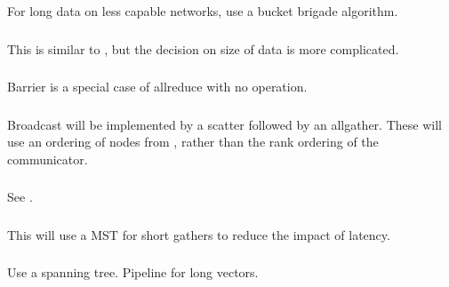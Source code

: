 \documentclass{article}
\begin{document}
For long data on less capable networks, use a bucket brigade algorithm.

\subsubsection{}
This is similar to , but the decision on size of data is
more complicated. 

\subsubsection{}

\subsubsection{}
Barrier is a special case of allreduce with no operation.

\subsubsection{}
Broadcast will be implemented by a scatter followed by an allgather.  These
will use an ordering of nodes from , rather than
the rank ordering of the communicator.

\subsubsection{}
See .

\subsubsection{}
This will use a MST for short gathers to reduce the impact of latency.  

\subsubsection{}

\subsubsection{}
Use a spanning tree.  Pipeline for long vectors.

\subsubsection{}
\end{document}
